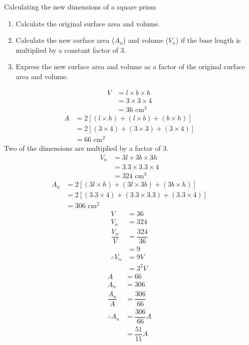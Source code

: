 \begin{wex}{Calculating the new dimensions of a square prism}
{\begin{enumerate}[noitemsep, label=\textbf{\arabic*}. ] 
 \item Calculate the original surface area and volume.
\item Calculate the new surface area ($A_n$) and volume ($V_n$) if the base length is multiplied by a constant factor of $3$.
\item Express the new surface area and volume as a factor of the original surface area and volume.
\end{enumerate}
}
{
\begin{align*}
V&=l\times b\times h\\
&=3\times3\times4\\
&= 36\mbox{ cm}^3
\end{align*}
\begin{align*}
A &= 2[(l \times h) + (l \times b) + (b \times h)]\\
&= 2[(3 \times 4) + (3 \times 3) + (3 \times 4)]\\
&= 66 \mbox{ cm}^2
\end{align*}
Two of the dimensions are multiplied by a factor of $3$.
\begin{align*}
V_n&=3l\times 3b \times 3h\\
&=3.3\times3.3\times4\\
&= 324\mbox{ cm}^3
\end{align*}
\begin{align*}
A_n &= 2[(3l \times h) + (3l \times 3b) + (3b \times h)]\\
&= 2[(3.3 \times 4) + (3.3 \times 3.3) + (3.3 \times 4)]\\
&= 306 \mbox{ cm}^2
\end{align*}
\begin{align*}
V&=36\\
V_n&= 324\\
\dfrac{V_n}{V} &=\dfrac{324}{36}\\
&=9\\
\therefore V_n&=9V\\
&=3^2 V
\end{align*}
\begin{align*}
A &= 66 \\
A_n&= 306\\
\dfrac{A_n}{A} &=\dfrac{306}{66}\\
\therefore A_n&= \dfrac{306}{66}A\\
&=\dfrac{51}{11}A\\

\end{align*}
}
\end{wex}

